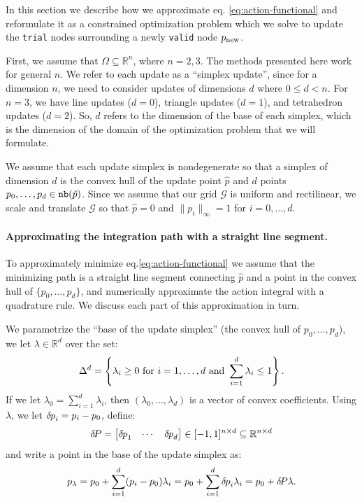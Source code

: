 \documentclass[smallcondensed]{svjour3}
\begin{document}
In this section we describe how we approximate eq.\@
\ref{eq:action-functional} and reformulate it as a constrained
optimization problem which we solve to update the \texttt{trial} nodes
surrounding a newly \texttt{valid} node $p_{\operatorname{new}}$.

First, we assume that $\Omega \subseteq \mathbb{R}^n$, where
$n = 2, 3$. The methods presented here work for general $n$. We refer
to each update as a ``simplex update'', since for a dimension $n$, we
need to consider updates of dimensions $d$ where $0 \leq d < n$. For
$n = 3$, we have line updates ($d = 0$), triangle updates ($d = 1$),
and tetrahedron updates ($d = 2$). So, $d$ refers to the dimension of
the base of each simplex, which is the dimension of the domain of the
optimization problem that we will formulate.

We assume that each update simplex is nondegenerate so that a simplex
of dimension $d$ is the convex hull of the update point $\hat{p}$ and
$d$ points $p_0, \hdots, p_{d} \in \texttt{nb}(\hat{p})$. Since we assume
that our grid $\mathcal{G}$ is uniform and rectilinear, we scale and
translate $\mathcal{G}$ so that $\hat{p} = 0$ and $\|p_i\|_\infty = 1$
for $i = 0, \hdots, d$.

\paragraph{Approximating the integration path with a straight line
  segment.} To approximately minimize eq.\@ \ref{eq:action-functional}
we assume that the minimizing path is a straight line segment
connecting $\hat{p}$ and a point in the convex hull of
$\{p_0, \hdots, p_d\}$, and numerically approximate the action
integral with a quadrature rule. We discuss each part of this
approximation in turn.

We parametrize the ``base of the update simplex'' (the convex hull of
$p_0, \hdots, p_d$), we let $\lambda \in \mathbb{R}^d$ over the set:
\begin{equation}
  \label{eq:lambda}
  \Delta^d = \left\{\lambda_i \geq 0 \mbox{ for } i = 1, \hdots, d \mbox{ and } \sum_{i=1}^d \lambda_i \leq 1\right\}.
\end{equation}
If we let $\lambda_0 = \sum_{i=1}^d \lambda_i$, then
$(\lambda_0, \hdots, \lambda_d)$ is a vector of convex coefficients.
Using $\lambda$, we let ${\delta \hspace{-0.08em} p}_i = p_i - p_0$, define:
\begin{equation}
  {\delta \hspace{-0.14em} P} = \begin{bmatrix}
    {\delta \hspace{-0.08em} p}_1 & \cdots & {\delta \hspace{-0.08em} p}_d
  \end{bmatrix} \in [-1, 1]^{n \times d} \subseteq \mathbb{R}^{n \times d}
\end{equation}
and write a point in the base of the update simplex as:
\begin{equation}
  p_\lambda = p_0 + \sum_{i=1}^d (p_i - p_0) \lambda_i = p_0 + \sum_{i=1}^d {\delta \hspace{-0.08em} p}_i \lambda_i = p_0 + {\delta \hspace{-0.14em} P} \lambda.
\end{equation}
\end{document}
